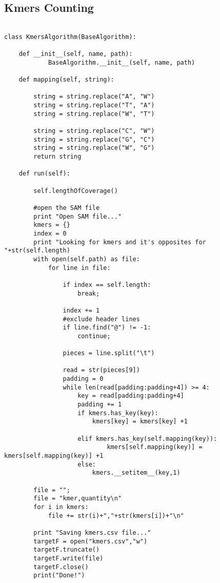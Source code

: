 \subsection{Kmers Counting}
\tiny
\begin{verbatim}

class KmersAlgorithm(BaseAlgorithm):
	
	def __init__(self, name, path):
    		BaseAlgorithm.__init__(self, name, path)

    def mapping(self, string):

        string = string.replace("A", "W")
        string = string.replace("T", "A")
        string = string.replace("W", "T")

        string = string.replace("C", "W")
        string = string.replace("G", "C")
        string = string.replace("W", "G")
        return string

    def run(self):

        self.lengthOfCoverage()

        #open the SAM file
        print "Open SAM file..."
        kmers = {}
        index = 0
        print "Looking for kmers and it's opposites for "+str(self.length)
        with open(self.path) as file:
            for line in file:

                if index == self.length:
                    break;

                index += 1
                #exclude header lines
                if line.find("@") != -1:
                    continue;

                pieces = line.split("\t")

                read = str(pieces[9])
                padding = 0
                while len(read[padding:padding+4]) >= 4:
                    key = read[padding:padding+4]
                    padding += 1
                    if kmers.has_key(key):
                        kmers[key] = kmers[key] +1

                    elif kmers.has_key(self.mapping(key)):
                            kmers[self.mapping(key)] = kmers[self.mapping(key)] +1
                    else:
                        kmers.__setitem__(key,1)

        file = "";
        file = "kmer,quantity\n"
        for i in kmers:
            file += str(i)+","+str(kmers[i])+"\n"

        print "Saving kmers.csv file..."
        targetF = open("kmers.csv","w")
        targetF.truncate()
        targetF.write(file)
        targetF.close()
        print("Done!")
\end{verbatim}

